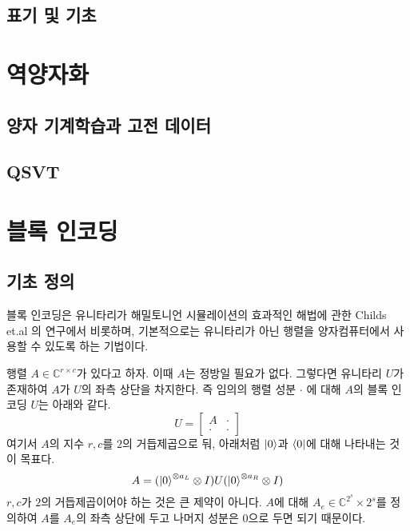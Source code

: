 \documentclass[hidelinks,article,a4paper,chapter,twocolumn]{oblivoir}
\begin{document}
\section{표기 및 기초}
\chapter{역양자화}
\section{양자 기계학습과 고전 데이터}
\section{QSVT}
\chapter{블록 인코딩}
\section{기초 정의}
블록 인코딩은 유니타리가 해밀토니언 시뮬레이션의 효과적인 해법에 관한
Childs et.al \cite{Childs2017}의 연구에서 비롯하며, 기본적으로는 유니타리가
아닌 행렬을 양자컴퓨터에서 사용할 수 있도록 하는 기법이다. 

행렬 $A\in\mathbb{C}^{r\times c}$가 있다고 하자. 이때 $A$는 정방일 필요가
없다. 그렇다면 유니타리 $U$가 존재하여 $A$가 $U$의 좌측 상단을 차지한다. 즉
임의의 행렬 성분 $\cdot$ 에 대해 $A$의 블록 인코딩 $U$는 아래와 같다.
\begin{equation}
  U = \begin{bmatrix}A&\cdot\\\cdot&\cdot\end{bmatrix}
\end{equation}
여기서 $A$의 지수 $r,c$를 $2$의 거듭제곱으로 둬, 아래처럼 $\ket0$과 $\bra0$에
대해 나타내는 것이 목표다. 
\begin{equation}
  A = (\ket0^{\otimes a_L}\otimes I)U(\ket0^{\otimes a_R}\otimes I)
\end{equation}
$r,c$가 $2$의 거듭제곱이어야 하는 것은 큰 제약이 아니다. $A$에 대해 $A_e\in
\mathbb{C}^{2^s}\times{2^s}$를 정의하여 $A$를 $A_e$의 좌측 상단에 두고 나머지
성분은 $0$으로 두면 되기 때문이다. 
\end{document}
